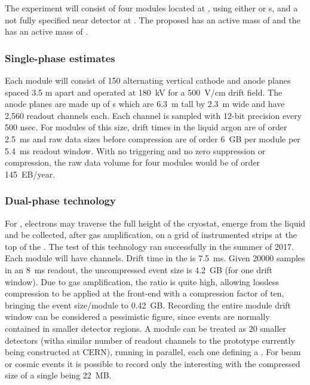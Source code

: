 The  experiment will consist of four \larmass {} modules located at  \surf, using either  or  \lartpc{}s, and a not fully specified near detector at \fnal. The proposed   has an active mass of \spactivelarmass and the  has an active mass of \dpactivelarmass{}.

\subsubsection{Single-phase estimates}
 Each  \single  module will consist of 
150 alternating vertical cathode and anode planes  spaced 3.5 m apart and operated at 180~kV for a 500~V/cm drift field.  The anode planes are made up of s which are 6.3~m tall by 2.3~m wide and have 2,560 readout channels each. Each channel is sampled with 12-bit precision every 500 nsec. %
For modules of this size, drift times in the liquid argon are of order 2.5~ms and raw data sizes before compression are of order 6~GB per module per 5.4~ms readout window.  With no triggering and no zero suppression or compression, the raw data volume for four modules would be of order 145~EB/year. 




\subsubsection{Dual-phase technology}

For \dual, electrons may traverse the full height of the cryostat, emerge from the liquid and be collected,  after gas amplification, on a grid of instrumented strips at the top of the .  The  test of this technology ran successfully in the summer of 2017\cite{Murphy:20170516}. 
Each \dpactivelarmass module will have \dpnumcrpch channels. Drift time in the \lar is \SI{7.5}{ms}. Given \num{20000} samples in an \SI{8}{ms} readout, the uncompressed event size is \SI{4.2}{GB} (for one  drift window).  Due to gas amplification, the  ratio is quite high, allowing lossless compression to be applied at the front-end  with a compression factor of ten, bringing the event size/module to  \SI{0.42}{GB}. Recording the entire module drift window can be considered a pessimistic figure, since events are normally contained in smaller detector regions. A  module can be treated as \num{20} smaller detectors (witha similar number  of readout channels to the prototype currently being constructed at CERN), running in parallel, each one defining a . For beam or cosmic events it is possible to record only the interesting  with the compressed size of a single  being \SI{22}{MB}.

